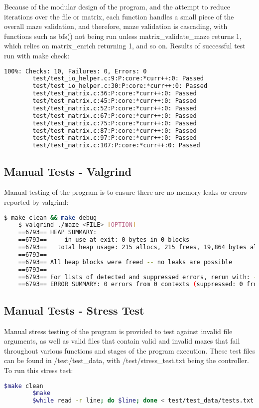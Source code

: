 \documentclass{article}
\begin{document}
    Because of the modular design of the program, and the attempt to reduce iterations over the file or matrix, each function handles a small piece of the overall maze validation, and therefore, maze validation is cascading, with functions such as bfs() not being run unless matrix\_validate\_maze returns 1, which relies on matrix\_enrich returning 1, and so on.
    Results of successful test run with make check:
    \begin{lstlisting}[language=bash]
        100%: Checks: 10, Failures: 0, Errors: 0
        test/test_io_helper.c:9:P:core:*curr++:0: Passed
        test/test_io_helper.c:30:P:core:*curr++:0: Passed
        test/test_matrix.c:36:P:core:*curr++:0: Passed
        test/test_matrix.c:45:P:core:*curr++:0: Passed
        test/test_matrix.c:52:P:core:*curr++:0: Passed
        test/test_matrix.c:67:P:core:*curr++:0: Passed
        test/test_matrix.c:75:P:core:*curr++:0: Passed
        test/test_matrix.c:87:P:core:*curr++:0: Passed
        test/test_matrix.c:97:P:core:*curr++:0: Passed
        test/test_matrix.c:107:P:core:*curr++:0: Passed        
    \end{lstlisting}

    \subsection{Manual Tests - Valgrind}
    Manual testing of the program is to ensure there are no memory leaks or errors reported by valgrind:
    \begin{lstlisting}[language=bash]
    $ make clean && make debug
    $ valgrind ./maze <FILE> [OPTION]
    ==6793== HEAP SUMMARY:
    ==6793==     in use at exit: 0 bytes in 0 blocks
    ==6793==   total heap usage: 215 allocs, 215 frees, 19,864 bytes allocated
    ==6793== 
    ==6793== All heap blocks were freed -- no leaks are possible
    ==6793== 
    ==6793== For lists of detected and suppressed errors, rerun with: -s
    ==6793== ERROR SUMMARY: 0 errors from 0 contexts (suppressed: 0 from 0)

        \end{lstlisting}

        \subsection{Manual Tests - Stress Test}
        Manual stress testing of the program is provided to test against invalid file arguments, as well as valid files that contain valid and invalid mazes that fail throughout various functions and stages of the program execution. These test files can be found in /test/test\_data, with /test/stress\_test.txt being the controller. To run this stress test:
        \begin{lstlisting}[language=bash]
        $make clean
        $make
        $while read -r line; do $line; done < test/test_data/tests.txt
        \end{lstlisting}
\end{document}
